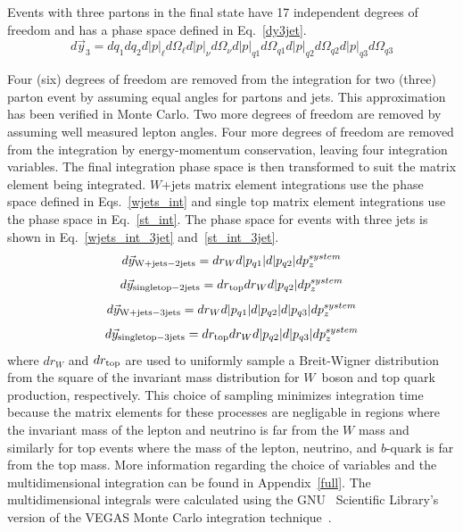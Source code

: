 \begin{itemize}
Events with three partons in the final state have 17 independent
degrees of freedom and has a phase space defined in Eq.~\ref{dy3jet}.
\begin{equation}
\label{dy3jet}
d\vec{y}_{3} = dq_{1}dq_{2}d|p|_{\ell}
d\Omega_{\ell}d|p|_{\nu}
d\Omega_{\nu}d|p|_{q1}
d\Omega_{q1}d|p|_{q2}
d\Omega_{q2}d|p|_{q3}
d\Omega_{q3}
\end{equation}

Four (six) degrees of freedom are removed from the integration for two
(three) parton event by assuming equal angles for partons and
jets. This approximation has been verified in Monte Carlo. Two more
degrees of freedom are removed by assuming well measured lepton
angles. Four more degrees of freedom are removed from the integration
by energy-momentum conservation, leaving four integration
variables. The final integration phase space is then transformed to
suit the matrix element being integrated. $W$+jets matrix element
integrations use the phase space defined in Eqs.~\ref{wjets_int} and
single top matrix element integrations use the phase space in
Eq.~\ref{st_int}. The phase space for events with three jets is shown
in Eq.~\ref{wjets_int_3jet} and~\ref{st_int_3jet}.
\begin{equation}
\label{wjets_int}
d\vec{y}_{\rm{W+jets - 2jets}}
= dr_{W}d|p_{q1}|d|p_{q2}|dp^{system}_{z}
\end{equation}
\begin{equation}
\label{st_int}
d\vec{y}_{\rm{single top - 2jets}} = dr_{\rm{top}}
dr_{W}d|p_{q2}|dp^{system}_{z}
\end{equation}
\begin{equation}
\label{wjets_int_3jet}
d\vec{y}_{\rm{W+jets - 3jets}}
= dr_{W}d|p_{q1}|d|p_{q2}|d|p_{q3}|dp^{system}_{z}
\end{equation}
\begin{equation}
\label{st_int_3jet}
d\vec{y}_{\rm{single top - 3jets}}
= dr_{\rm{top}}dr_{W}d|p_{q2}|d|p_{q3}|dp^{system}_{z}
\end{equation}
\noindent 
where $dr_{W}$ and $dr_{\rm{top}}$ are used to uniformly sample a Breit-Wigner distribution from the square of the
invariant mass distribution for $W$~boson and top quark production,
respectively. This choice of sampling minimizes integration time because the
matrix elements for these processes are negligable in regions where the invariant
mass of the lepton and neutrino is far from the $W$ mass and similarly for top
events where the mass of the lepton, neutrino, and $b$-quark is far from the top
mass. More information regarding the choice of variables and
the multidimensional integration can be found in
Appendix~\ref{full}. The multidimensional integrals were calculated
using the GNU~\cite{GNU} Scientific Library's version of the VEGAS
Monte Carlo integration technique~\cite{Lepage:1980dq}.

\end{itemize}

